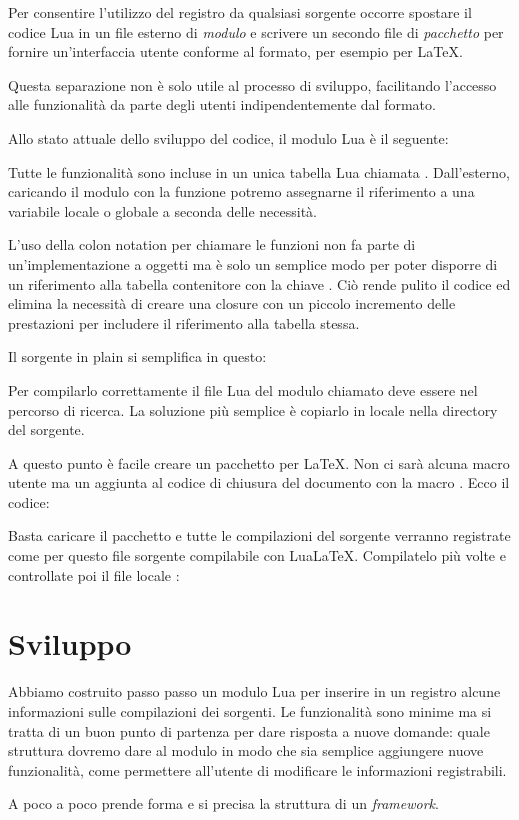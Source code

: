 Per consentire l'utilizzo del registro da qualsiasi sorgente occorre spostare il
codice Lua in un file esterno di \emph{modulo} e scrivere un secondo file di
\emph{pacchetto} per fornire un'interfaccia utente conforme al formato, per
esempio per \LaTeX{}.

Questa separazione non è solo utile al processo di sviluppo, facilitando
l'accesso alle funzionalità da parte degli utenti indipendentemente dal formato.

Allo stato attuale dello sviluppo del codice, il modulo Lua è il seguente:

Tutte le funzionalità sono incluse in un unica tabella Lua chiamata
. Dall'esterno, caricando il modulo con la funzione 
potremo assegnarne il riferimento a una variabile locale o globale a seconda
delle necessità.

L'uso della colon notation per chiamare le funzioni non fa parte di
un'implementazione a oggetti ma è solo un semplice modo per poter disporre di un
riferimento alla tabella contenitore con la chiave . Ciò rende pulito
il codice ed elimina la necessità di creare una closure con un piccolo
incremento delle prestazioni per includere il riferimento alla tabella stessa.

Il sorgente in plain \LuaTeX{} si semplifica in questo:

Per compilarlo correttamente il file Lua del modulo chiamato
 deve essere nel percorso di ricerca. La soluzione più
semplice è copiarlo in locale nella directory del sorgente.

A questo punto è facile creare un pacchetto per \LaTeX{}. Non ci sarà alcuna
macro utente ma un aggiunta al codice di chiusura del documento con la macro
. Ecco il codice:

Basta caricare il pacchetto e tutte le compilazioni del sorgente verranno
registrate come per questo file sorgente compilabile con Lua\LaTeX{}.
Compilatelo più volte e controllate poi il file locale :


\section{Sviluppo}

Abbiamo costruito passo passo un modulo Lua per inserire in un registro alcune
informazioni sulle compilazioni dei sorgenti. Le funzionalità sono minime ma si
tratta di un buon punto di partenza per dare risposta a nuove domande: quale
struttura dovremo dare al modulo in modo che sia semplice aggiungere nuove
funzionalità, come permettere all'utente di modificare le informazioni
registrabili.

A poco a poco prende forma e si precisa la struttura di un \emph{framework}.



